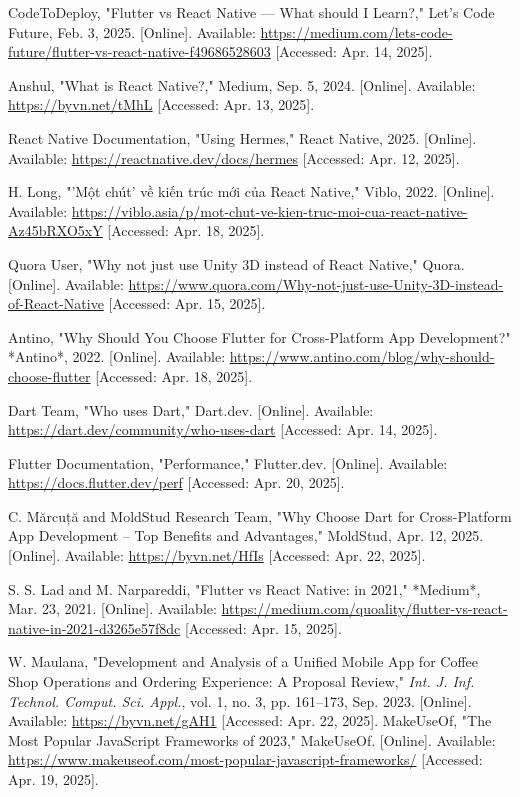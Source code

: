 \documentclass[12pt]{report}
\begin{document}
\begin{thebibliography}{1}
CodeToDeploy, "Flutter vs React Native — What should I Learn?," Let's Code Future, Feb. 3, 2025. [Online]. Available: \url{https://medium.com/lets-code-future/flutter-vs-react-native-f49686528603} [Accessed: Apr. 14, 2025].

Anshul, "What is React Native?," Medium, Sep. 5, 2024. [Online]. Available: \url{https://byvn.net/tMhL} [Accessed: Apr. 13, 2025].

React Native Documentation, "Using Hermes," React Native, 2025. [Online]. Available: \url{https://reactnative.dev/docs/hermes} [Accessed: Apr. 12, 2025].

H. Long, "'Một chút' về kiến trúc mới của React Native," Viblo, 2022. [Online]. Available: \url{https://viblo.asia/p/mot-chut-ve-kien-truc-moi-cua-react-native-Az45bRXO5xY} [Accessed: Apr. 18, 2025].

Quora User, "Why not just use Unity 3D instead of React Native," Quora. [Online]. Available: \url{https://www.quora.com/Why-not-just-use-Unity-3D-instead-of-React-Native} [Accessed: Apr. 15, 2025].

Antino, "Why Should You Choose Flutter for Cross-Platform App Development?" *Antino*, 2022. [Online]. Available: \url{https://www.antino.com/blog/why-should-choose-flutter} [Accessed: Apr. 18, 2025].


Dart Team, "Who uses Dart," Dart.dev. [Online]. Available: \url{https://dart.dev/community/who-uses-dart} [Accessed: Apr. 14, 2025].

Flutter Documentation, "Performance," Flutter.dev. [Online]. Available: \url{https://docs.flutter.dev/perf} [Accessed: Apr. 20, 2025].

C. Mărcuță and MoldStud Research Team, "Why Choose Dart for Cross-Platform App Development – Top Benefits and Advantages," MoldStud, Apr. 12, 2025. [Online]. Available: \url{https://byvn.net/HfIs} [Accessed: Apr. 22, 2025].

S. S. Lad and M. Narpareddi, "Flutter vs React Native: in 2021," *Medium*, Mar. 23, 2021. [Online]. Available: \url{https://medium.com/quoality/flutter-vs-react-native-in-2021-d3265e57f8dc} [Accessed: Apr. 15, 2025].

W. Maulana, "Development and Analysis of a Unified Mobile App for Coffee Shop Operations and Ordering Experience: A Proposal Review," \textit{Int. J. Inf. Technol. Comput. Sci. Appl.}, vol. 1, no. 3, pp. 161--173, Sep. 2023. [Online]. Available: \url{https://byvn.net/gAH1} [Accessed: Apr. 22, 2025].
MakeUseOf, "The Most Popular JavaScript Frameworks of 2023," MakeUseOf. [Online]. Available: \url{https://www.makeuseof.com/most-popular-javascript-frameworks/} [Accessed: Apr. 19, 2025].

\end{thebibliography}
\end{document}
